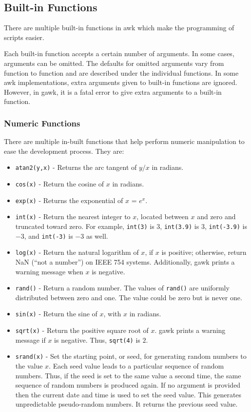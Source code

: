 \subsection{Built-in Functions}

There are multiple built-in functions in awk which make the programming of scripts easier.

Each built-in function accepts a certain number of arguments. In some cases, arguments can be omitted. The defaults for omitted arguments vary from function to function and are described under the individual functions. In some awk implementations, extra arguments given to built-in functions are ignored. However, in gawk, it is a fatal error to give extra arguments to a built-in function.

\subsubsection{Numeric Functions}

There are multiple in-built functions that help perform numeric manipulation to ease the development process. They are:


\begin{itemize}
  \item \lstinline|atan2(y,x)| - Returns the arc tangent of $y / x$ in radians.
  \item \lstinline|cos(x)| - Return the cosine of $x$ in radians.
  \item \lstinline|exp(x)| - Returns the exponential of $x$ = $e^x$.
  \item \lstinline|int(x)| - Return the nearest integer to $x$, located between $x$ and zero and truncated toward zero. For example, \lstinline|int(3)| is $3$, \lstinline|int(3.9)| is $3$, \lstinline|int(-3.9)| is $-3$, and \lstinline|int(-3)| is $-3$ as well.
  \item \lstinline|log(x)| - Return the natural logarithm of $x$, if $x$ is positive; otherwise, return NaN (“not a number”) on IEEE 754 systems. Additionally, gawk prints a warning message when $x$ is negative.
  \item \lstinline|rand()| - Return a random number. The values of \lstinline|rand()| are uniformly distributed between zero and one. The value could be zero but is never one.
  \item \lstinline|sin(x)| - Return the sine of $x$, with $x$ in radians.
  \item \lstinline|sqrt(x)| - Return the positive square root of $x$. gawk prints a warning message if $x$ is negative. Thus, \lstinline|sqrt(4)| is $2$.
  \item \lstinline|srand(x)| - Set the starting point, or seed, for generating random numbers to the value $x$. Each seed value leads to a particular sequence of random numbers. Thus, if the seed is set to the same value a second time, the same sequence of random numbers is produced again. If no argument is provided then the current date and time is used to set the seed value. This generates unpredictable pseudo-random numbers. It returns the previous seed value.
\end{itemize}

